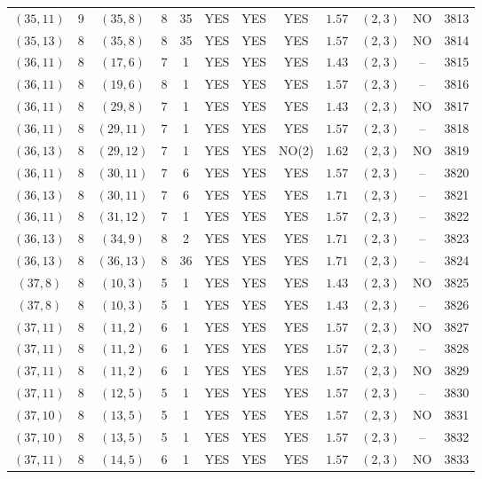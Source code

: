 \begin{longtable}{|c|c|c|c|c|c|c|c|c|c|c|c|}
$(35,11)$ & 9 & $(35,8)$ & 8 & 35 & YES & YES & YES & $1.57$ & $(2,3)$ & NO & 3813\\
$(35,13)$ & 8 & $(35,8)$ & 8 & 35 & YES & YES & YES & $1.57$ & $(2,3)$ & NO & 3814\\
$(36,11)$ & 8 & $(17,6)$ & 7 & 1 & YES & YES & YES & $1.43$ & $(2,3)$ & -- & 3815\\
$(36,11)$ & 8 & $(19,6)$ & 8 & 1 & YES & YES & YES & $1.57$ & $(2,3)$ & -- & 3816\\
$(36,11)$ & 8 & $(29,8)$ & 7 & 1 & YES & YES & YES & $1.43$ & $(2,3)$ & NO & 3817\\
$(36,11)$ & 8 & $(29,11)$ & 7 & 1 & YES & YES & YES & $1.57$ & $(2,3)$ & -- & 3818\\
$(36,13)$ & 8 & $(29,12)$ & 7 & 1 & YES & YES & NO(2) & $1.62$ & $(2,3)$ & NO & 3819\\
$(36,11)$ & 8 & $(30,11)$ & 7 & 6 & YES & YES & YES & $1.57$ & $(2,3)$ & -- & 3820\\
$(36,13)$ & 8 & $(30,11)$ & 7 & 6 & YES & YES & YES & $1.71$ & $(2,3)$ & -- & 3821\\
$(36,11)$ & 8 & $(31,12)$ & 7 & 1 & YES & YES & YES & $1.57$ & $(2,3)$ & -- & 3822\\
$(36,13)$ & 8 & $(34,9)$ & 8 & 2 & YES & YES & YES & $1.71$ & $(2,3)$ & -- & 3823\\
$(36,13)$ & 8 & $(36,13)$ & 8 & 36 & YES & YES & YES & $1.71$ & $(2,3)$ & -- & 3824\\
$(37,8)$ & 8 & $(10,3)$ & 5 & 1 & YES & YES & YES & $1.43$ & $(2,3)$ & NO & 3825\\
$(37,8)$ & 8 & $(10,3)$ & 5 & 1 & YES & YES & YES & $1.43$ & $(2,3)$ & -- & 3826\\
$(37,11)$ & 8 & $(11,2)$ & 6 & 1 & YES & YES & YES & $1.57$ & $(2,3)$ & NO & 3827\\
$(37,11)$ & 8 & $(11,2)$ & 6 & 1 & YES & YES & YES & $1.57$ & $(2,3)$ & -- & 3828\\
$(37,11)$ & 8 & $(11,2)$ & 6 & 1 & YES & YES & YES & $1.57$ & $(2,3)$ & NO & 3829\\
$(37,11)$ & 8 & $(12,5)$ & 5 & 1 & YES & YES & YES & $1.57$ & $(2,3)$ & -- & 3830\\
$(37,10)$ & 8 & $(13,5)$ & 5 & 1 & YES & YES & YES & $1.57$ & $(2,3)$ & NO & 3831\\
$(37,10)$ & 8 & $(13,5)$ & 5 & 1 & YES & YES & YES & $1.57$ & $(2,3)$ & -- & 3832\\
$(37,11)$ & 8 & $(14,5)$ & 6 & 1 & YES & YES & YES & $1.57$ & $(2,3)$ & NO & 3833\\

\end{longtable}
